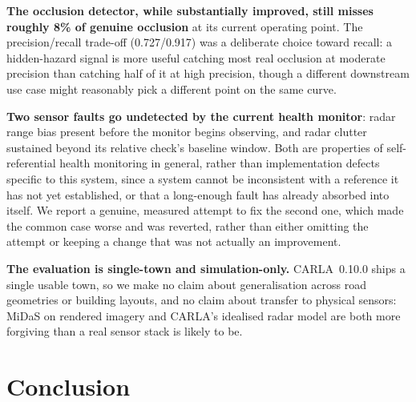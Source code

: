 \documentclass[conference]{IEEEtran}
\begin{document}
\textbf{The occlusion detector, while substantially improved, still
misses roughly 8\% of genuine occlusion} at its current operating
point. The precision/recall trade-off (0.727/0.917) was a deliberate
choice toward recall: a hidden-hazard signal is more useful catching
most real occlusion at moderate precision than catching half of it at
high precision, though a different downstream use case might reasonably
pick a different point on the same curve.

\textbf{Two sensor faults go undetected by the current health
monitor}: radar range bias present before the monitor begins observing,
and radar clutter sustained beyond its relative check's baseline
window. Both are properties of self-referential health monitoring in
general, rather than implementation defects specific to this system,
since a system cannot be inconsistent with a reference it has not yet
established, or that a long-enough fault has already absorbed into
itself. We report a genuine, measured attempt to fix the second one,
which made the common case worse and was reverted, rather than either
omitting the attempt or keeping a change that was not actually an
improvement.

\textbf{The evaluation is single-town and simulation-only.}
CARLA~0.10.0 ships a single usable town, so we make no claim about
generalisation across road geometries or building layouts, and no
claim about transfer to physical sensors: MiDaS on rendered imagery and
CARLA's idealised radar model are both more forgiving than a real
sensor stack is likely to be.

\section{Conclusion}
\label{sec:conclusion}
\end{document}
